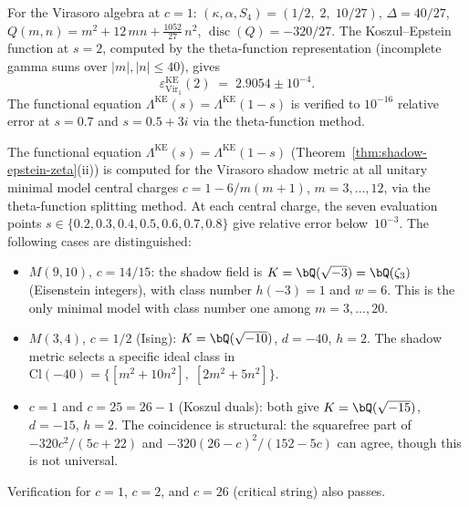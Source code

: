 \begin{computation}[Virasoro at $c = 1$: numerical Koszul--Epstein value;
\ClaimStatusProvedHere]%
\label{comp:virasoro-c1-koszul-epstein}%
%
For the Virasoro algebra at $c = 1$:
$(\kappa, \alpha, S_4) = (1/2,\; 2,\; 10/27)$,
$\Delta = 40/27$,
$Q(m,n) = m^2 + 12\,mn + \tfrac{1052}{27}\,n^2$,
$\operatorname{disc}(Q) = -320/27$.
The Koszul--Epstein function at $s = 2$, computed by the
theta-function representation
\textup{(}incomplete gamma sums over $|m|, |n| \leq 40$\textup{)},
gives
\begin{equation}\label{eq:virasoro-c1-ke-value}
 \varepsilon^{\mathrm{KE}}_{\mathrm{Vir}_1}(2)
 \;=\;
 2.9054 \pm 10^{-4}.
\end{equation}
The functional equation $\Lambda^{\mathrm{KE}}(s)
= \Lambda^{\mathrm{KE}}(1{-}s)$ is verified to
$10^{-16}$ relative error at $s = 0.7$ and
$s = 0.5 + 3i$ via the theta-function method.
\end{computation}

\begin{computation}%
\label{comp:fe-minimal-models}%
%
The functional equation
$\Lambda^{\mathrm{KE}}(s) = \Lambda^{\mathrm{KE}}(1{-}s)$
\textup{(}Theorem~\textup{\ref{thm:shadow-epstein-zeta}(ii)}\textup{)}
is computed for the Virasoro shadow metric
at all unitary minimal model central charges $c = 1 - 6/m(m{+}1)$,
$m = 3, \ldots, 12$, via the theta-function splitting method.
At each central charge, the seven evaluation points
$s \in \{0.2, 0.3, 0.4, 0.5, 0.6, 0.7, 0.8\}$ give
relative error below~$10^{-3}$.
The following cases are distinguished:
\begin{itemize}[nosep]
\item
$M(9,10)$, $c = 14/15$: the shadow field is
$K = \bQ(\sqrt{-3}) = \bQ(\zeta_3)$
\textup{(}Eisenstein integers\textup{)}, with
class number $h(-3) = 1$ and $w = 6$.
This is the only minimal model with class number one
among $m = 3, \ldots, 20$.
\item
$M(3,4)$, $c = 1/2$ \textup{(}Ising\textup{)}:
$K = \bQ(\sqrt{-10})$, $d = -40$, $h = 2$.
The shadow metric selects a specific ideal class in
$\mathrm{Cl}(-40) = \{[m^2 {+} 10n^2],\; [2m^2 {+} 5n^2]\}$.
\item
$c = 1$ and $c = 25 = 26 - 1$ \textup{(}Koszul duals\textup{)}:
both give $K = \bQ(\sqrt{-15})$, $d = -15$, $h = 2$.
The coincidence is structural: the squarefree part of
$-320c^2/(5c{+}22)$ and $-320(26{-}c)^2/(152{-}5c)$ can
agree, though this is not universal.
\end{itemize}
Verification for $c = 1$, $c = 2$, and $c = 26$
\textup{(}critical string\textup{)} also passes.
\end{computation}

